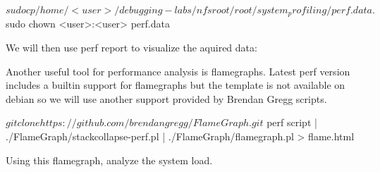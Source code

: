\begin{bashinput}
$ sudo cp /home/<user>/debugging-labs/nfsroot/root/system_profiling/perf.data .
$ sudo chown <user>:<user> perf.data
\end{bashinput}

We will then use perf report to visualize the aquired data:


Another useful tool for performance analysis is flamegraphs. Latest perf
version includes a builtin support for flamegraphs but the template is not
available on debian so we will use another support provided by Brendan Gregg
scripts.

\begin{bashinput}
$ git clone https://github.com/brendangregg/FlameGraph.git
$ perf script | ./FlameGraph/stackcollapse-perf.pl | ./FlameGraph/flamegraph.pl > flame.html
\end{bashinput}

Using this flamegraph, analyze the system load.